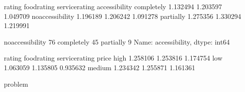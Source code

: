 \documentclass[letterpaper,10pt,english]{jupyterBook}
\begin{document}
\begin{sphinxVerbatim}[commandchars=\\\{\}]
                    rating  food\PYGZus{}rating  service\PYGZus{}rating
accessibility                                          
completely        1.132494     1.203597        1.049709
no\PYGZus{}accessibility  1.196189     1.206242        1.091278
partially         1.275356     1.330294        1.219991
\end{sphinxVerbatim}

\begin{sphinxVerbatim}[commandchars=\\\{\}]
\end{sphinxVerbatim}

\begin{sphinxVerbatim}[commandchars=\\\{\}]
no\PYGZus{}accessibility    76
completely          45
partially            9
Name: accessibility, dtype: int64
\end{sphinxVerbatim}

\begin{sphinxVerbatim}[commandchars=\\\{\}]
\PYG{p}{[}\PYG{p}{[}  \PYG{p}{]}\PYG{p}{]}
\end{sphinxVerbatim}

\begin{sphinxVerbatim}[commandchars=\\\{\}]
          rating  food\PYGZus{}rating  service\PYGZus{}rating
price                                        
high    1.258106     1.253816        1.174754
low     1.063059     1.135805        0.935632
medium  1.234342     1.255871        1.161361
\end{sphinxVerbatim}

\begin{sphinxVerbatim}[commandchars=\\\{\}]
     problem
\end{sphinxVerbatim}
\end{document}
